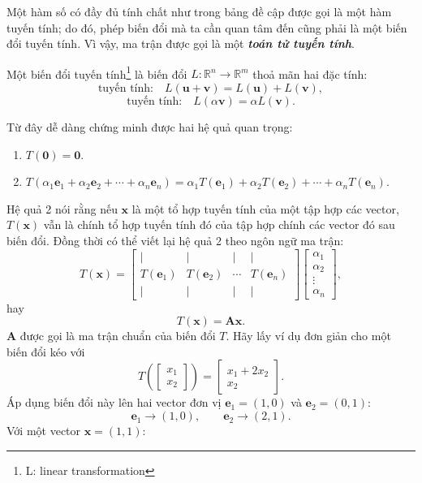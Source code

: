 Một hàm số có đầy đủ tính chất như trong bảng đề cập được gọi là một hàm tuyến tính; do đó, phép biến đổi mà ta cần quan tâm đến cũng phải là một biến đổi tuyến tính. Vì vậy, ma trận được gọi là một \textbf{\emph{toán tử tuyến tính}}.
\begin{definition}
    Một biến đổi tuyến tính\footnote{L: linear transformation} là biến đổi \(L: \mathbb{R}^n \rightarrow\mathbb{R}^m\) thoả mãn hai đặc tính:
    \[\text{tuyến tính:}\quad L(\mathbf{u}+\mathbf{v})=L(\mathbf{u})+L(\mathbf{v}),\]
    \[\text{tuyến tính:}\quad L(\alpha\mathbf{v})=\alpha L(\mathbf{v}).\]
\end{definition}
Từ đây dễ dàng chứng minh được hai hệ quả quan trọng:
\begin{enumerate}
    \item \(T(\mathbf{0})=\mathbf{0}\).
    \item \(T(\alpha_{1}\mathbf{e}_1+\alpha_2 \mathbf{e}_2 +\cdots +\alpha_n \mathbf{e}_{n})=\alpha_1 T(\mathbf{e}_1)+\alpha_2 T(\mathbf{e}_2)+\cdots +\alpha_n T(\mathbf{e}_n)\).
\end{enumerate}
Hệ quả 2 nói rằng nếu \(\mathbf{x}\) là một tổ hợp tuyến tính của một tập hợp các vector, \(T(\mathbf{x})\) vẫn là chính tổ hợp tuyến tính đó của tập hợp chính các vector đó sau biến đổi. 
Đồng thời có thể viết lại hệ quả 2 theo ngôn ngữ ma trận:
\[T(\mathbf{x})=\begin{bmatrix}
    \lvert & \lvert &\lvert &\lvert\\
    T(\mathbf{e}_1)&T(\mathbf{e}_2)&\cdots&T(\mathbf{e}_n)\\
     \lvert & \lvert &\lvert &\lvert
\end{bmatrix}\begin{bmatrix}
    \alpha_1 \\\alpha_2 \\\vdots\\ \alpha_n
\end{bmatrix},\] hay \[T(\mathbf{x})=\mathbf{A}\mathbf{x}.\]
\(\mathbf{A}\) được gọi là ma trận chuẩn của biến đổi \(T\). Hãy lấy ví dụ đơn giản cho một biến đổi kéo với 
\[T\left(\begin{bmatrix}
    x_1 \\x_2
\end{bmatrix}\right)=\begin{bmatrix}
    x_1 +2x_2 \\x_2
\end{bmatrix}.\] Áp dụng biến đổi này lên hai vector đơn vị \(\mathbf{e}_1 =(1,0)\) và \(\mathbf{e}_2 =(0,1)\):
\[\mathbf{e}_1 \rightarrow (1,0),\qquad \mathbf{e}_2 \rightarrow (2,1).\] Với một vector \(\mathbf{x}=(1,1)\):
